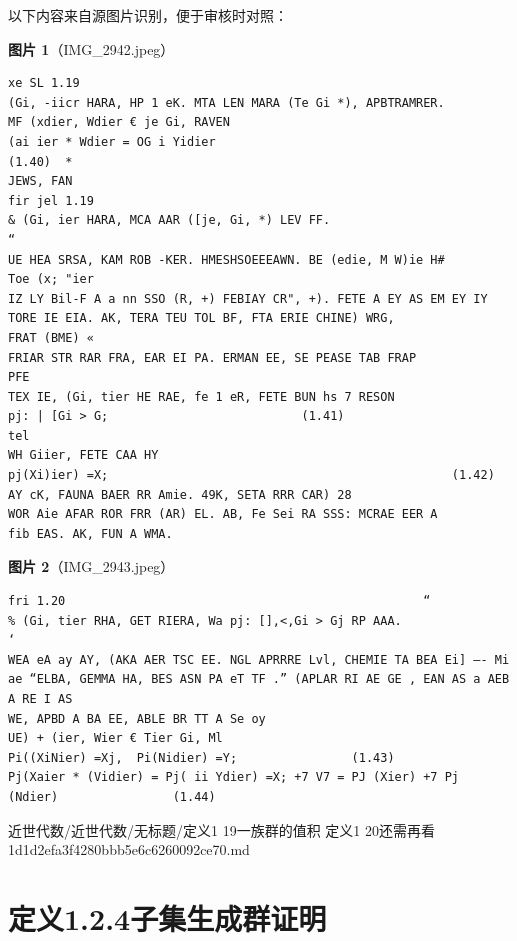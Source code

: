 \begin{note}
以下内容来自源图片识别，便于审核时对照：

\textbf{图片 1}（IMG\_2942.jpeg）
\begin{Verbatim}[fontsize=\small]
xe SL 1.19
(Gi, -iicr HARA, HP 1 eK. MTA LEN MARA (Te Gi *), APBTRAMRER.
MF (xdier, Wdier € je Gi, RAVEN
(ai ier * Wdier = OG i Yidier                                     (1.40)  *
JEWS, FAN
fir jel 1.19
& (Gi, ier HARA, MCA AAR ([je, Gi, *) LEV FF.                                              “
UE HEA SRSA, KAM ROB -KER. HMESHSOEEEAWN. BE (edie, M W)ie H#
Toe (x; "ier
IZ LY Bil-F A a nn SSO (R, +) FEBIAY CR", +). FETE A EY AS EM EY IY
TORE IE EIA. AK, TERA TEU TOL BF, FTA ERIE CHINE) WRG,
FRAT (BME) «
FRIAR STR RAR FRA, EAR EI PA. ERMAN EE, SE PEASE TAB FRAP
PFE
TEX IE, (Gi, tier HE RAE, fe 1 eR, FETE BUN hs 7 RESON
pj: | [Gi > G;                           (1.41)
tel
WH Giier, FETE CAA HY
pj(Xi)ier) =X;                                                (1.42)
AY cK, FAUNA BAER RR Amie. 49K, SETA RRR CAR) 28
WOR Aie AFAR ROR FRR (AR) EL. AB, Fe Sei RA SSS: MCRAE EER A
fib EAS. AK, FUN A WMA.
\end{Verbatim}

\textbf{图片 2}（IMG\_2943.jpeg）
\begin{Verbatim}[fontsize=\small]
fri 1.20                                                  “
% (Gi, tier RHA, GET RIERA, Wa pj: [],<,Gi > Gj RP AAA.                   ‘
WEA eA ay AY, (AKA AER TSC EE. NGL APRRRE Lvl, CHEMIE TA BEA Ei] —- Mi
ae “ELBA, GEMMA HA, BES ASN PA eT TF .” (APLAR RI AE GE , EAN AS a AEB A RE I AS
WE, APBD A BA EE, ABLE BR TT A Se oy
UE) + (ier, Wier € Tier Gi, Ml
Pi((XiNier) =Xj,  Pi(Nidier) =Y;                (1.43)
Pj(Xaier * (Vidier) = Pj( ii Ydier) =X; +7 V7 = PJ (Xier) +7 Pj (Ndier)                (1.44)
\end{Verbatim}

\end{note}

\begin{note}[来源路径]

近世代数/近世代数/无标题/定义1 19一族群的值积 定义1 20还需再看 1d1d2efa3f4280bbb5e6c6260092ce70.md

\end{note}

\section*{定义1.2.4子集生成群证明}

